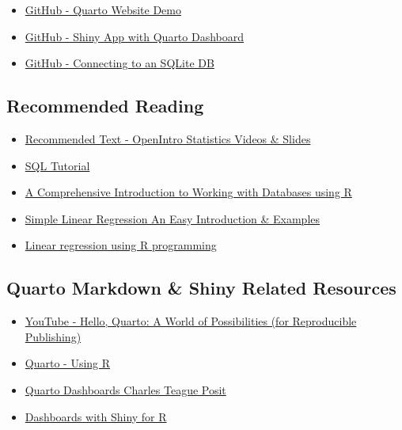 \documentclass[
  letterpaper,
  DIV=11,
  numbers=noendperiod]{scrartcl}
\providecommand{\tightlist}{%
  \setlength{\itemsep}{0pt}\setlength{\parskip}{0pt}}\usepackage{longtable,booktabs,array}
\begin{document}
\begin{itemize}
\tightlist
\item
  \href{https://github.com/nmcguinness/2023_MSC_DataAnalytics_Quarto_Demo.git}{GitHub
  - Quarto Website Demo}
\item
  \href{https://github.com/nmcguinness/2023_MSC_DataAnalytics_Shiny_Quarto_Demo.git}{GitHub
  - Shiny App with Quarto Dashboard}
\item
  \href{https://github.com/nmcguinness/2023_MSC_DataAnalytics_SQL.git}{GitHub
  - Connecting to an SQLite DB}
\end{itemize}

\subsection{Recommended Reading}\label{recommended-reading}

\begin{itemize}
\tightlist
\item
  \href{https://www.openintro.org/book/os/}{Recommended Text - OpenIntro
  Statistics Videos \& Slides}
\item
  \href{https://www.w3schools.com/sql/}{SQL Tutorial}
\item
  \href{https://blog.rsquaredacademy.com/working-with-databases-using-r/}{A
  Comprehensive Introduction to Working with Databases using R}
\item
  \href{https://www.scribbr.com/statistics/simple-linear-regression/}{Simple
  Linear Regression \textbar{} An Easy Introduction \& Examples}
\item
  \href{https://youtu.be/-mGXnm0fHtI}{Linear regression using R
  programming}
\end{itemize}

\subsection{Quarto Markdown \& Shiny Related
Resources}\label{quarto-markdown-shiny-related-resources}

\begin{itemize}
\tightlist
\item
  \href{https://youtu.be/Qrz2rUWM-uY}{YouTube - Hello, Quarto: A World
  of Possibilities (for Reproducible Publishing)}
\item
  \href{https://quarto.org/docs/computations/r.html}{Quarto - Using R}
\item
  \href{https://www.youtube.com/watch?v=_VGJIPRGTy4}{Quarto Dashboards
  \textbar{} Charles Teague \textbar{} Posit}
\item
  \href{https://quarto.org/docs/dashboards/interactivity/shiny-r.html}{Dashboards
  with Shiny for R}
\end{itemize}
\end{document}
